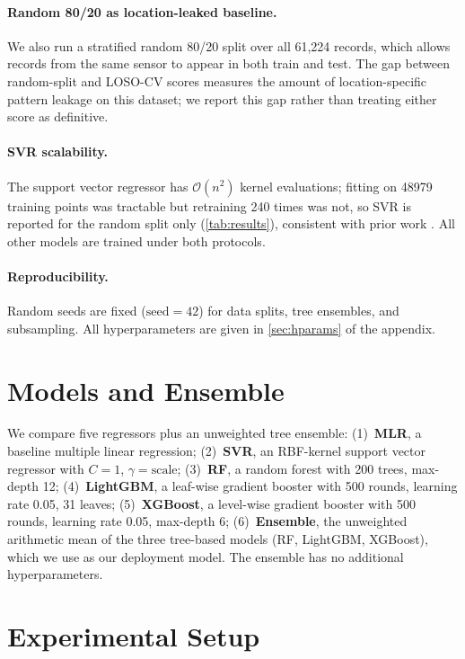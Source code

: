 \documentclass{article}
\begin{document}
\paragraph{Random 80/20 as location-leaked baseline.} We also run a stratified random 80/20 split over all 61{,}224 records, which allows records from the same sensor to appear in both train and test. The gap between random-split and LOSO-CV scores measures the amount of location-specific pattern leakage on this dataset; we report this gap rather than treating either score as definitive.

\paragraph{SVR scalability.} The support vector regressor has $\mathcal{O}(n^2)$ kernel evaluations; fitting on \num{48979} training points was tractable but retraining 240 times was not, so SVR is reported for the random split only (\autoref{tab:results}), consistent with prior work \citep{ghahremanloo2021}. All other models are trained under both protocols.

\paragraph{Reproducibility.} Random seeds are fixed ($\mathrm{seed}=42$) for data splits, tree ensembles, and subsampling. All hyperparameters are given in \autoref{sec:hparams} of the appendix.

\section{Models and Ensemble}
\label{sec:models}

We compare five regressors plus an unweighted tree ensemble:
(1)~\textbf{MLR}, a baseline multiple linear regression;
(2)~\textbf{SVR}, an RBF-kernel support vector regressor with $C=1$, $\gamma=\mathrm{scale}$;
(3)~\textbf{RF}, a random forest with 200 trees, max-depth 12;
(4)~\textbf{LightGBM}, a leaf-wise gradient booster with 500 rounds, learning rate 0.05, 31 leaves;
(5)~\textbf{XGBoost}, a level-wise gradient booster with 500 rounds, learning rate 0.05, max-depth 6;
(6)~\textbf{Ensemble}, the unweighted arithmetic mean of the three tree-based models (RF, LightGBM, XGBoost), which we use as our deployment model. The ensemble has no additional hyperparameters.

\section{Experimental Setup}
\end{document}
